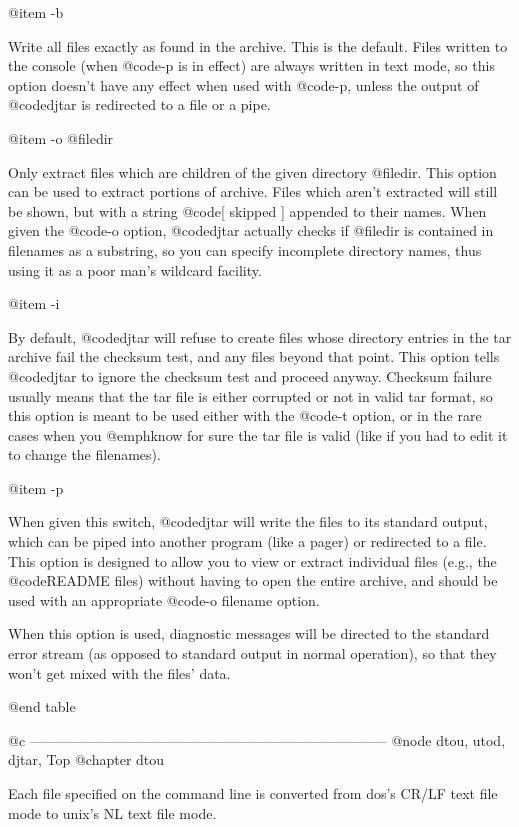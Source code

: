 @item -b

Write all files exactly as found in the archive.  This is the default.
Files written to the console (when @code{-p} is in effect) are always
written in text mode, so this option doesn't have any effect when used
with @code{-p}, unless the output of @code{djtar} is redirected to a file
or a pipe.

@item -o @file{dir}

Only extract files which are children of the given directory @file{dir}.
This option can be used to extract portions of archive.  Files which aren't
extracted will still be shown, but with a string @code{[ skipped ]}
appended to their names.  When given the @code{-o} option, @code{djtar}
actually checks if @file{dir} is contained in filenames as a substring, so
you can specify incomplete directory names, thus using it as a poor man's
wildcard facility.

@item -i

By default, @code{djtar} will refuse to create files whose directory
entries in the tar archive fail the checksum test, and any files beyond
that point.  This option tells @code{djtar} to ignore the checksum test
and proceed anyway.  Checksum failure usually means that the tar file is
either corrupted or not in valid tar format, so this option is meant to be
used either with the @code{-t} option, or in the rare cases when you
@emph{know} for sure the tar file is valid (like if you had to edit it to
change the filenames).

@item -p

When given this switch, @code{djtar} will write the files to its standard
output, which can be piped into another program (like a pager) or
redirected to a file.  This option is designed to allow you to view or
extract individual files (e.g., the @code{README} files) without having to
open the entire archive, and should be used with an appropriate @code{-o
filename} option.

When this option is used, diagnostic messages will be directed to the
standard error stream (as opposed to standard output in normal operation),
so that they won't get mixed with the files' data.

@end table

@c -----------------------------------------------------------------------------
@node dtou, utod, djtar, Top
@chapter dtou

Each file specified on the command line is converted from dos's CR/LF
text file mode to unix's NL text file mode.

